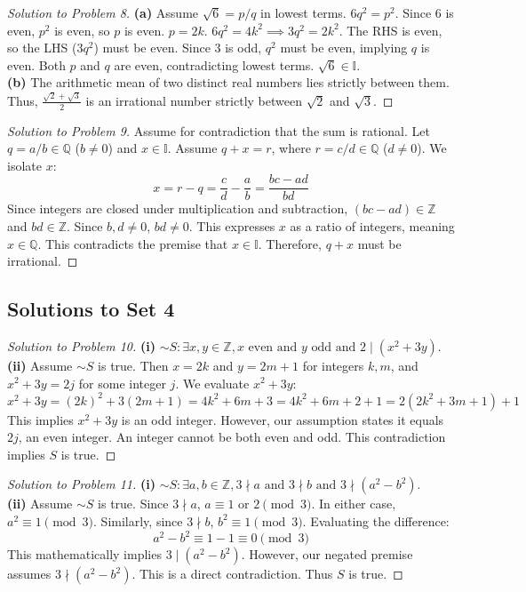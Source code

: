 \documentclass{article}
\begin{document}
\begin{proof}[Solution to Problem 8]
\textbf{(a)} Assume $\sqrt{6} = p/q$ in lowest terms. $6q^2 = p^2$. Since $6$ is even, $p^2$ is even, so $p$ is even. $p = 2k$. $6q^2 = 4k^2 \implies 3q^2 = 2k^2$. The RHS is even, so the LHS ($3q^2$) must be even. Since $3$ is odd, $q^2$ must be even, implying $q$ is even. Both $p$ and $q$ are even, contradicting lowest terms. $\sqrt{6} \in \mathbb{I}$. \\
\textbf{(b)} The arithmetic mean of two distinct real numbers lies strictly between them. Thus, $\frac{\sqrt{2} + \sqrt{3}}{2}$ is an irrational number strictly between $\sqrt{2}$ and $\sqrt{3}$.
\end{proof}

\begin{proof}[Solution to Problem 9]
Assume for contradiction that the sum is rational. Let $q = a/b \in \mathbb{Q}$ ($b \neq 0$) and $x \in \mathbb{I}$. Assume $q + x = r$, where $r = c/d \in \mathbb{Q}$ ($d \neq 0$). We isolate $x$:
\[ x = r - q = \frac{c}{d} - \frac{a}{b} = \frac{bc - ad}{bd} \]
Since integers are closed under multiplication and subtraction, $(bc-ad) \in \mathbb{Z}$ and $bd \in \mathbb{Z}$. Since $b, d \neq 0$, $bd \neq 0$. This expresses $x$ as a ratio of integers, meaning $x \in \mathbb{Q}$. This contradicts the premise that $x \in \mathbb{I}$. Therefore, $q+x$ must be irrational.
\end{proof}

\subsection{Solutions to Set 4}
\begin{proof}[Solution to Problem 10]
\textbf{(i)} $\sim S: \exists x, y \in \mathbb{Z}, x \text{ even and } y \text{ odd and } 2 \mid (x^2+3y)$. \\
\textbf{(ii)} Assume $\sim S$ is true. Then $x=2k$ and $y=2m+1$ for integers $k,m$, and $x^2+3y = 2j$ for some integer $j$. We evaluate $x^2+3y$:
\[ x^2+3y = (2k)^2 + 3(2m+1) = 4k^2 + 6m + 3 = 4k^2 + 6m + 2 + 1 = 2(2k^2 + 3m + 1) + 1 \]
This implies $x^2+3y$ is an odd integer. However, our assumption states it equals $2j$, an even integer. An integer cannot be both even and odd. This contradiction implies $S$ is true.
\end{proof}

\begin{proof}[Solution to Problem 11]
\textbf{(i)} $\sim S: \exists a,b \in \mathbb{Z}, 3 \nmid a \text{ and } 3 \nmid b \text{ and } 3 \nmid (a^2-b^2)$. \\
\textbf{(ii)} Assume $\sim S$ is true. Since $3 \nmid a$, $a \equiv 1 \text{ or } 2 \pmod 3$. In either case, $a^2 \equiv 1 \pmod 3$. Similarly, since $3 \nmid b$, $b^2 \equiv 1 \pmod 3$. 
Evaluating the difference:
\[ a^2 - b^2 \equiv 1 - 1 \equiv 0 \pmod 3 \]
This mathematically implies $3 \mid (a^2-b^2)$. However, our negated premise assumes $3 \nmid (a^2-b^2)$. This is a direct contradiction. Thus $S$ is true.
\end{proof}
\end{document}
